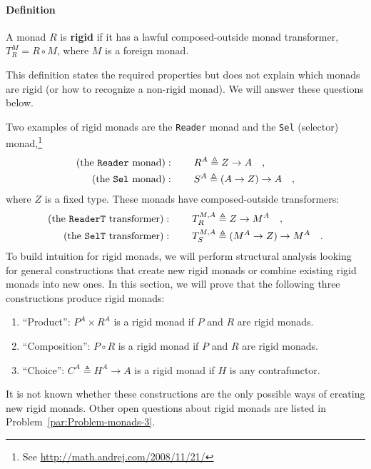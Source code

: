 \paragraph{Definition}

A monad $R$ is \textbf{rigid} if it has a lawful composed-outside
monad transformer, $T_{R}^{M}=R\circ M$, where $M$ is a foreign
monad. 

This definition states the required properties but does not explain
which monads are rigid (or how to recognize a non-rigid monad). We
will answer these questions below.

Two examples of rigid monads are the \lstinline!Reader! monad and
the \lstinline!Sel! (selector)
monad,\footnote{See \href{http://math.andrej.com/2008/11/21/}{http://math.andrej.com/2008/11/21/}}
\begin{align*}
\text{(the \texttt{Reader} monad)} & :\quad\quad R^{A}\triangleq Z\rightarrow A\quad,\\
\text{(the \texttt{Sel} monad)} & :\quad\quad S^{A}\triangleq\left(A\rightarrow Z\right)\rightarrow A\quad,
\end{align*}
where $Z$ is a fixed type. These monads have composed-outside transformers:
\begin{align*}
\text{(the \texttt{ReaderT} transformer)} & :\quad\quad T_{R}^{M,A}\triangleq Z\rightarrow M^{A}\quad,\\
\text{(the \texttt{SelT} transformer)} & :\quad\quad T_{S}^{M,A}\triangleq(M^{A}\rightarrow Z)\rightarrow M^{A}\quad.
\end{align*}
To build intuition for rigid monads, we will perform structural analysis
looking for general constructions that create new rigid monads or
combine existing rigid monads into new ones. In this section, we will
prove that the following three constructions produce rigid monads:
\begin{enumerate}
\item \textsf{``}Product\textsf{''}: $P^{A}\times R^{A}$ is a rigid monad if $P$ and $R$
are rigid monads.
\item \textsf{``}Composition\textsf{''}: $P\circ R$ is a rigid monad if $P$ and $R$ are
rigid monads.
\item \textsf{``}Choice\textsf{''}: $C^{A}\triangleq H^{A}\rightarrow A$ is a rigid monad
if $H$ is any contrafunctor.
\end{enumerate}
It is not known whether these constructions are the only possible
ways of creating new rigid monads. Other open questions about rigid
monads are listed in Problem~\ref{par:Problem-monads-3}.

